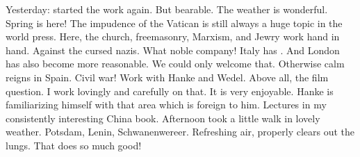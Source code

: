 Yesterday: started the work again. But bearable. The weather is wonderful. Spring is here! The impudence of the Vatican is still always a huge topic in the world press. Here, the church, freemasonry, Marxism, and Jewry work hand in hand. Against the cursed nazis. What noble company! Italy has . And London has also become more reasonable. We could only welcome that. Otherwise calm reigns in Spain. Civil war! Work with Hanke and Wedel. Above all, the film question. I work lovingly and carefully on that. It is very enjoyable. Hanke is familiarizing himself with that area which is foreign to him. Lectures in my consistently interesting China book. Afternoon took a little walk in lovely weather. Potsdam, Lenin, Schwanenwereer. Refreshing air, properly clears out the lungs. That does so much good! \missing

